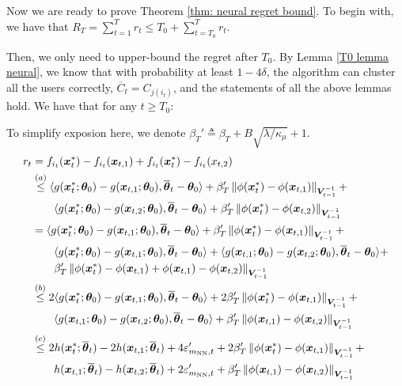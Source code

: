 Now we are ready to prove Theorem \ref{thm: neural regret bound}.
To begin with, we have that
$
    R_T=\sum_{t=1}^T r_t\leq T_0 +\sum_{t=T_0}^T r_t$.

Then, we only need to upper-bound the regret after $T_0$. By Lemma \ref{T0 lemma neural}, we know that with probability at least $1-4\delta$, the algorithm can cluster all the users correctly, $\overline{C}_t=C_{j(i_t)}$, and the statements of all the above lemmas hold. We have that for any $t\geq T_0$:
    
To simplify exposion here, we denote $\beta_T' \triangleq \beta_T + B \sqrt{\lambda / \kappa_\mu} + 1$.
\begin{equation}
\begin{split}
r_t &= f_{i_t}(\bx^*_t) - f_{i_t}(\bx_{t,1}) + f_{i_t}(\bx^*_t) - f_{i_t}(x_{t,2})\\
&\stackrel{(a)}{\leq} \langle g(\bx^*_t;\btheta_0) - g(\bx_{t,1};\btheta_0), \overline\btheta_t-\btheta_0 \rangle + \beta_T' \norm{\phi(\bx^*_t) - \phi(\bx_{t,1})}_{\bV_{t-1}^{-1}} + \\
&\qquad \langle g(\bx^*_t;\btheta_0) - g(\bx_{t,2};\btheta_0), \overline\btheta_t-\btheta_0 \rangle + \beta_T'\norm{\phi(\bx^*_t) - \phi(\bx_{t,2})}_{\bV_{t-1}^{-1}}\\
&= \langle g(\bx^*_t;\btheta_0) - g(\bx_{t,1};\btheta_0), \overline\btheta_t-\btheta_0 \rangle + \beta_T' \norm{\phi(\bx^*_t) - \phi(\bx_{t,1})}_{\bV_{t-1}^{-1}} + \\
&\qquad \langle g(\bx^*_t;\btheta_0) - g(\bx_{t,1};\btheta_0), \overline\btheta_t-\btheta_0 \rangle + \langle g(\bx_{t,1};\btheta_0) - g(\bx_{t,2};\btheta_0), \overline\btheta_t-\btheta_0 \rangle + \\
&\qquad \beta_T'\norm{\phi(\bx^*_t) - \phi(\bx_{t,1}) + \phi(\bx_{t,1}) - \phi(\bx_{t,2})}_{\bV_{t-1}^{-1}}\\
&\stackrel{(b)}{\leq} 2 \langle g(\bx^*_t;\btheta_0) - g(\bx_{t,1};\btheta_0), \overline\btheta_t-\btheta_0 \rangle + 2 \beta_T' \norm{\phi(\bx^*_t) - \phi(\bx_{t,1})}_{\bV_{t-1}^{-1}} + \\
&\qquad \langle g(\bx_{t,1};\btheta_0) - g(\bx_{t,2};\btheta_0), \overline\btheta_t-\btheta_0 \rangle + \beta_T'\norm{\phi(\bx_{t,1}) - \phi(\bx_{t,2})}_{\bV_{t-1}^{-1}}\\
&\stackrel{(c)}{\leq} 2 h(\bx^*_t;\overline{\btheta}_t) - 2 h(\bx_{t,1};\overline{\btheta}_t) + 4\varepsilon'_{m_{\text{NN}},t} + 2 \beta_T' \norm{\phi(\bx^*_t) - \phi(\bx_{t,1})}_{\bV_{t-1}^{-1}} + \\
&\qquad h(\bx_{t,1};\overline{\btheta}_t) - h(\bx_{t,2};\overline{\btheta}_t) + 2\varepsilon'_{m_{\text{NN}},t} + \beta_T'\norm{\phi(\bx_{t,1}) - \phi(\bx_{t,2})}_{\bV_{t-1}^{-1}}\\

\end{split}
\end{equation}
